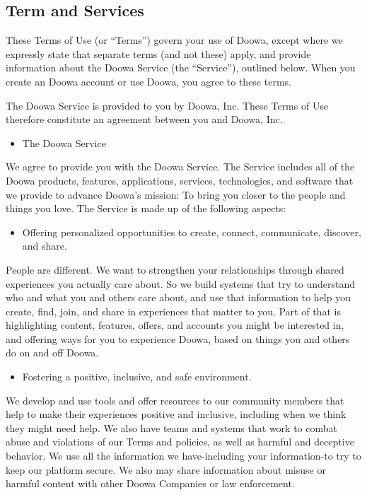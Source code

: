\documentclass[conference]{IEEEtran}
\begin{document}
\subsection{Term and Services}

These Terms of Use (or “Terms”) govern your use of Doowa, except where we expressly state that separate terms (and not these) apply, and provide information about the Doowa Service (the “Service”), outlined below. When you create an Doowa account or use Doowa, you agree to these terms.

The Doowa Service is provided to you by Doowa, Inc. These Terms of Use therefore constitute an agreement between you and Doowa, Inc.

\begin{itemize}
\item  The Doowa Service
\end{itemize}
We agree to provide you with the Doowa Service. The Service includes all of the Doowa products, features, applications, services, technologies, and software that we provide to advance Doowa's mission: To bring you closer to the people and things you love. The Service is made up of the following aspects:

\begin{itemize}
\item Offering personalized opportunities to create, connect, communicate, discover, and share.
\end{itemize}

People are different. We want to strengthen your relationships through shared experiences you actually care about. So we build systems that try to understand who and what you and others care about, and use that information to help you create, find, join, and share in experiences that matter to you. Part of that is highlighting content, features, offers, and accounts you might be interested in, and offering ways for you to experience Doowa, based on things you and others do on and off Doowa.

\begin{itemize}
\item Fostering a positive, inclusive, and safe environment.
\end{itemize}

We develop and use tools and offer resources to our community members that help to make their experiences positive and inclusive, including when we think they might need help. We also have teams and systems that work to combat abuse and violations of our Terms and policies, as well as harmful and deceptive behavior. We use all the information we have-including your information-to try to keep our platform secure. We also may share information about misuse or harmful content with other Doowa Companies or law enforcement.
\end{document}
